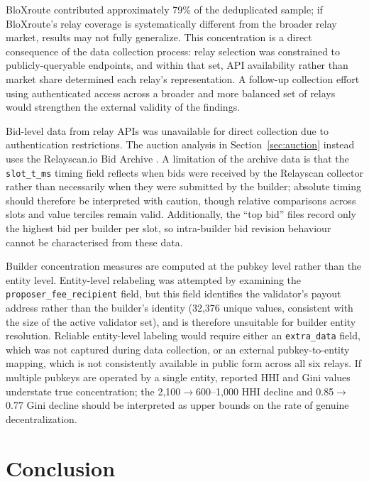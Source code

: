 \documentclass[11pt]{article}
\begin{document}
BloXroute contributed approximately 79\% of the deduplicated sample; if
BloXroute's relay coverage is systematically different from the broader relay
market, results may not fully generalize. This concentration is a direct
consequence of the data collection process: relay selection was constrained to
publicly-queryable endpoints, and within that set, API availability rather than
market share determined each relay's representation. A follow-up collection
effort using authenticated access across a broader and more balanced set of
relays would strengthen the external validity of the findings.

Bid-level data from relay APIs was unavailable for direct collection due to
authentication restrictions. The auction analysis in Section~\ref{sec:auction}
instead uses
the Relayscan.io Bid Archive \citep{relayscan2024}. A limitation of the archive
data is that the \texttt{slot\_t\_ms} timing field reflects when bids were
received by the Relayscan collector rather than necessarily when they were
submitted by the builder; absolute timing should therefore be interpreted with
caution, though relative comparisons across slots and value terciles remain
valid. Additionally, the ``top bid'' files record only the highest bid per
builder per slot, so intra-builder bid revision behaviour cannot be characterised
from these data.

Builder concentration measures are computed at the pubkey level rather than
the entity level. Entity-level relabeling was attempted by examining the
\texttt{proposer\_fee\_recipient} field, but this field identifies the
validator's payout address rather than the builder's identity (32,376 unique
values, consistent with the size of the active validator set), and is
therefore unsuitable for builder entity resolution. Reliable entity-level
labeling would require either an \texttt{extra\_data} field, which was not
captured during data collection, or an external pubkey-to-entity mapping,
which is not consistently available in public form across all six relays. If
multiple pubkeys are operated by a single entity, reported HHI and Gini
values understate true concentration; the 2,100$\to$600--1,000 HHI decline
and 0.85$\to$0.77 Gini decline should be interpreted as upper bounds on the
rate of genuine decentralization.

\section{Conclusion}
\label{sec:conclusion}
\end{document}
